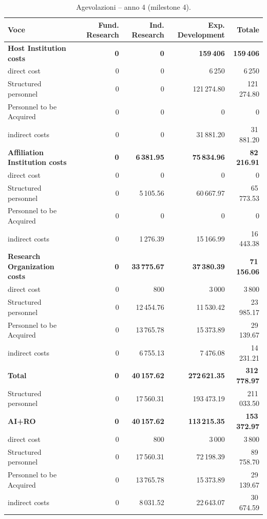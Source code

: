 \documentclass{plan4ari_report}
\begin{document}
\begin{table}[H]\centering\small
\caption{Agevolazioni -- anno 4 (milestone 4).}\label{tab:bpy-a-y4}
\begin{tabular}{lrrrr}\toprule
\textbf{Voce} & \textbf{Fund. Research} & \textbf{Ind. Research} & \textbf{Exp. Development} & \textbf{Totale} \\\midrule
\textbf{Host Institution costs} & \textbf{0} & \textbf{0} & \textbf{159\,406} & \textbf{159\,406} \\
\quad direct cost & 0 & 0 & 6\,250 & 6\,250 \\
\quad Structured personnel & 0 & 0 & 121\,274.80 & 121\,274.80 \\
\quad Personnel to be Acquired & 0 & 0 & 0 & 0 \\
\quad indirect costs & 0 & 0 & 31\,881.20 & 31\,881.20 \\
\textbf{Affiliation Institution costs} & \textbf{0} & \textbf{6\,381.95} & \textbf{75\,834.96} & \textbf{82\,216.91} \\
\quad direct cost & 0 & 0 & 0 & 0 \\
\quad Structured personnel & 0 & 5\,105.56 & 60\,667.97 & 65\,773.53 \\
\quad Personnel to be Acquired & 0 & 0 & 0 & 0 \\
\quad indirect costs & 0 & 1\,276.39 & 15\,166.99 & 16\,443.38 \\
\textbf{Research Organization costs} & \textbf{0} & \textbf{33\,775.67} & \textbf{37\,380.39} & \textbf{71\,156.06} \\
\quad direct cost & 0 & 800 & 3\,000 & 3\,800 \\
\quad Structured personnel & 0 & 12\,454.76 & 11\,530.42 & 23\,985.17 \\
\quad Personnel to be Acquired & 0 & 13\,765.78 & 15\,373.89 & 29\,139.67 \\
\quad indirect costs & 0 & 6\,755.13 & 7\,476.08 & 14\,231.21 \\
\midrule
\textbf{Total} & \textbf{0} & \textbf{40\,157.62} & \textbf{272\,621.35} & \textbf{312\,778.97} \\
\quad Structured personnel & 0 & 17\,560.31 & 193\,473.19 & 211\,033.50 \\
\textbf{AI+RO} & \textbf{0} & \textbf{40\,157.62} & \textbf{113\,215.35} & \textbf{153\,372.97} \\
\quad direct cost & 0 & 800 & 3\,000 & 3\,800 \\
\quad Structured personnel & 0 & 17\,560.31 & 72\,198.39 & 89\,758.70 \\
\quad Personnel to be Acquired & 0 & 13\,765.78 & 15\,373.89 & 29\,139.67 \\
\quad indirect costs & 0 & 8\,031.52 & 22\,643.07 & 30\,674.59 \\
\bottomrule\end{tabular}
\end{table}
\end{document}
